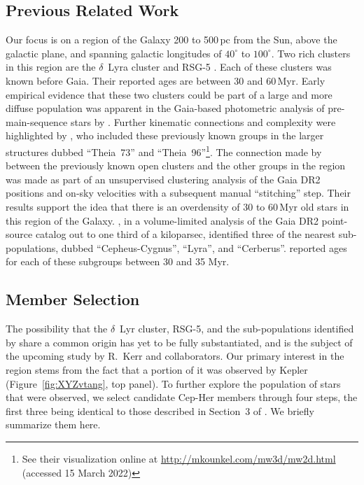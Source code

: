 \documentclass[12pt,twocolumn]{aastex63}
\begin{document}
\subsection{Previous Related Work}

Our focus is on a region of the Galaxy 200 to 500\,pc
from the Sun, above the galactic plane, and spanning galactic
longitudes of $40^\circ$ to $100^\circ$.  Two rich clusters in
this region are the $\delta$~Lyra cluster
\citep{stephenson_possible_1959} and RSG-5 \citep{roser_nine_2016}.
Each of these clusters was known before Gaia.  Their reported ages are
between 30 and 60\,Myr.  Early empirical evidence that these two
clusters could be part of a large and more diffuse population was
apparent in the Gaia-based photometric analysis of pre-main-sequence
stars by \citet[][see their Figures~11 and~13]{Zari2018}.  Further
kinematic connections and complexity were highlighted by
\citet{KounkelCovey2019}, who included these previously known groups
in the larger structures dubbed ``Theia~73'' and
``Theia~96''\footnote{See their visualization online at
\url{http://mkounkel.com/mw3d/mw2d.html} (accessed 15 March 2022)}.
The connection made by \citet{KounkelCovey2019} between the previously
known open clusters and the other groups in the region was made as
part of an unsupervised clustering analysis of the Gaia DR2 positions
and on-sky velocities with a subsequent manual ``stitching'' step.
Their results support the idea that there is an overdensity of 30 to
60\,Myr old stars in this region of the Galaxy.  \citet{Kerr2021}, in
a volume-limited analysis of the Gaia DR2 point-source catalog out to
one third of a kiloparsec, identified three of the nearest
sub-populations, dubbed ``Cepheus-Cygnus'', ``Lyra'', and
``Cerberus''.  \citet{Kerr2021} reported ages for each of these
subgroups between 30 and 35 Myr.


\subsection{Member Selection}
\label{subsec:members}

The possibility that the $\delta$~Lyr cluster, RSG-5, and the
sub-populations identified by \citet{Kerr2021} share a common origin
has yet to be fully substantiated, and is the subject of the upcoming
study by R.~Kerr and collaborators.  Our primary interest in the
region stems from the fact that a portion of it was observed by Kepler
(Figure~\ref{fig:XYZvtang}, top panel).  To further explore the
population of stars that were observed, we select candidate Cep-Her
members through four steps, the first three being identical to those
described in Section~3 of \citet{Kerr2021}.  We briefly summarize them
here.
\end{document}
